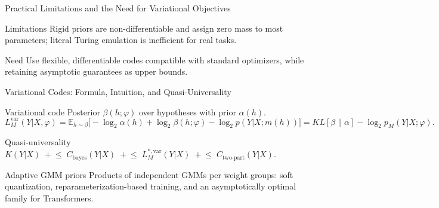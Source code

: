 \documentclass{beamer}
\begin{document}
\begin{frame}{Practical Limitations and the Need for Variational Objectives}
\small
\begin{block}{Limitations}
Rigid priors are non-differentiable and assign zero mass to most parameters; literal Turing emulation is inefficient for real tasks.
\end{block}

\begin{block}{Need}
Use flexible, differentiable codes compatible with standard optimizers, while retaining asymptotic guarantees as upper bounds.
\end{block}
\end{frame}

\begin{frame}{Variational Codes: Formula, Intuition, and Quasi-Universality}
\small
\begin{block}{Variational code}
Posterior $\beta(h;\varphi)$ over hypotheses with prior $\alpha(h)$. 
$$
L^{\text{var}}_M(Y|X,\varphi)=\mathbb{E}_{h\sim\beta}\big[-\log_2\alpha(h)+\log_2\beta(h;\varphi)-\log_2 p(Y|X;m(h))\big]= KL[\beta\|\alpha]-\log_2 p_M(Y|X;\varphi).
$$
\end{block}

\begin{block}{Quasi-universality}
$K(Y|X)\;{+}\!\le\; C_{\text{bayes}}(Y|X)\;{+}\!\le\; L^{\ast,\text{var}}_M(Y|X)\;{+}\!\le\; C_{\text{two-part}}(Y|X)$.
\end{block}

\begin{block}{Adaptive GMM priors}
Products of independent GMMs per weight groups: soft quantization, reparameterization-based training, and an asymptotically optimal family for Transformers.
\end{block}
\end{frame}
\end{document}
